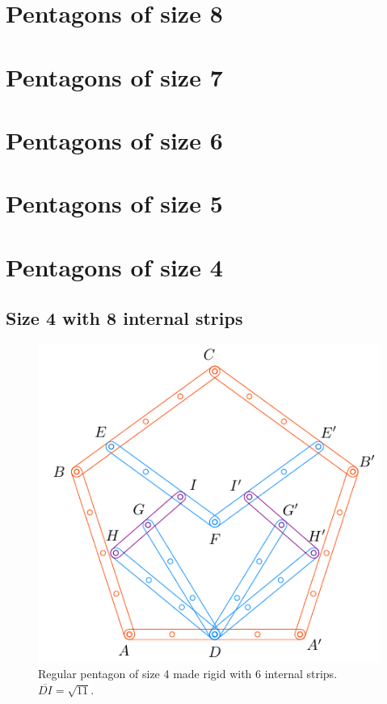 \documentclass[11pt]{article}
\begin{document}
\section{Pentagons of size 8}

\section{Pentagons of size 7}

\section{Pentagons of size 6}

\section{Pentagons of size 5}

\section{Pentagons of size 4}

\subsection{Size 4 with 8 internal strips}

\begin{figure}[H]
\centering
\includegraphics[scale=1.1]{4/penta4-8a}
\caption{Regular pentagon of size 4 made rigid with 6 internal strips. $\overline{DI} = \sqrt{11}$.}
\label{fig:penta4-8a}
\end{figure}
\end{document}
